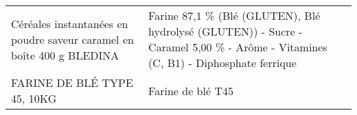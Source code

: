 \begin{longtable}{p{5cm}p{10cm}}
                                    Céréales instantanées en poudre saveur caramel en boîte 400 g BLEDINA &                                                                                                                                                                                                                                                                                                                                                                                                                                                                                                                                                                                                                                                                                                                                                                                                                                                                                                         Farine 87,1 \% (Blé (GLUTEN), Blé hydrolysé (GLUTEN)) - Sucre - Caramel 5,00 \% - Arôme - Vitamines (C, B1) - Diphosphate ferrique \\
                                                                              FARINE DE BLÉ TYPE 45, 10KG &                                                                                                                                                                                                                                                                                                                                                                                                                                                                                                                                                                                                                                                                                                                                                                                                                                                                                                                                                                                                                        Farine de blé T45 \\
\end{longtable}

